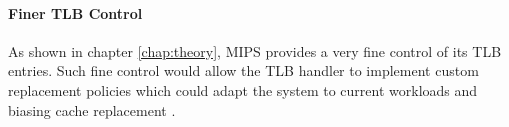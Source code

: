\paragraph{Finer TLB Control} As shown in chapter \ref{chap:theory}, MIPS \cite{MIPSArchitectureProgrammers2016} provides a very fine control of its TLB entries. Such fine control would allow the TLB handler to implement custom replacement policies which could adapt the system to current workloads and biasing cache replacement \cite{park2022every}.


%





%







